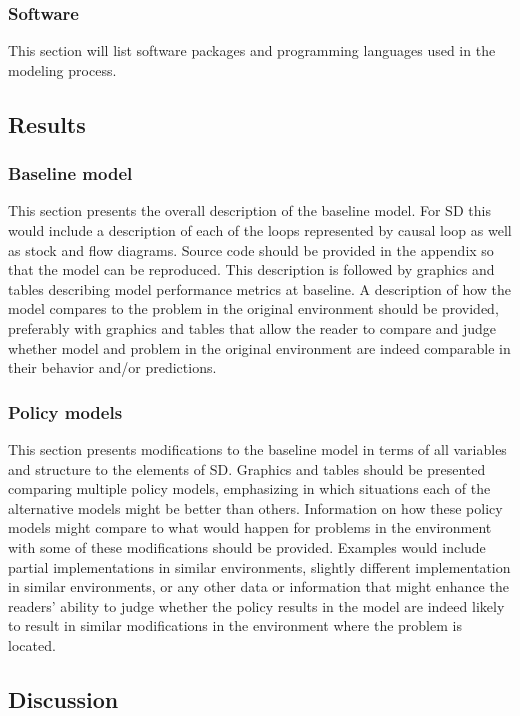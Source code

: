 \documentclass[11pt]{article}
\begin{document}
\subsubsection {Software}
This section will list software packages and programming languages used in the modeling process.

\subsection {Results}

\subsubsection {Baseline model}
This section presents the overall description of the baseline model. For SD this would include a description of each of the loops represented by causal loop as well as stock and flow diagrams. Source code should be provided in the appendix so that the model can be reproduced. This description is followed by graphics and tables describing model performance metrics at baseline. A description of how the model compares to the problem in the original environment should be provided, preferably with graphics and tables that allow the reader to compare and judge whether model and problem in the original environment are indeed comparable in their behavior and/or predictions.

\subsubsection {Policy models}
This section presents modifications to the baseline model in terms of all variables and structure to the elements of SD. Graphics and tables should be presented comparing multiple policy models, emphasizing in which situations each of the alternative models might be better than others. Information on how these policy models might compare to what would happen for problems in the environment with some of these modifications should be provided. Examples would include partial implementations in similar environments, slightly different implementation in similar environments, or any other data or information that might enhance the readers' ability to judge whether the policy results in the model are indeed likely to result in similar modifications in the environment where the problem is located.

\subsection {Discussion}
\end{document}
